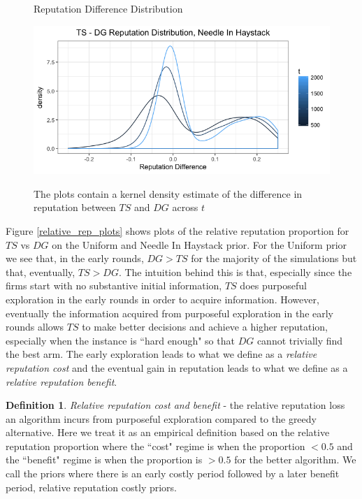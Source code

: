 \documentclass{article}
\theoremstyle{definition}
\newtheorem{definition}{Definition}
\begin{document}
\begin{figure}
\caption{Reputation Difference Distribution}
\includegraphics[scale=0.35]{figures/ts_dg_rep_diff_nih}
\label{ts_dg_rep_diff_nih}
\caption*{\tiny{The plots contain a kernel density estimate of the difference in reputation between $TS$ and $DG$ across $t$}}
\end{figure}

Figure \ref{relative_rep_plots} shows plots of the relative reputation proportion for $TS$ vs $DG$ on the Uniform and Needle In Haystack prior. For the Uniform prior we see that, in the early rounds, $DG > TS$ for the majority of the simulations but that, eventually, $TS > DG$. The intuition behind this is that, especially since the firms start with no substantive initial information, $TS$ does purposeful exploration in the early rounds in order to acquire information. However, eventually the information acquired from purposeful exploration in the early rounds allows $TS$ to make better decisions and achieve a higher reputation, especially when the instance is ``hard enough" so that $DG$ cannot trivially find the best arm. The early exploration leads to what we define as a \textit{relative reputation cost} and the eventual gain in reputation leads to what we define as a \textit{relative reputation benefit}.

\begin{definition}
\textit{Relative reputation cost and benefit} - the relative reputation loss an algorithm incurs from purposeful exploration compared to the greedy alternative. Here we treat it as an empirical definition based on the relative reputation proportion where the ``cost" regime is when the proportion $< 0.5$ and the ``benefit" regime is when the proportion is $> 0.5$ for the better algorithm. We call the priors where there is an early costly period followed by a later benefit period, relative reputation costly priors.
\end{definition}
\end{document}
